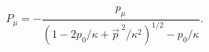 \begin{equation}
 P_{\mu}=-\frac{p_{\mu}}{(1-2p_{0}/\kappa
 +\vec{p}^{\;2}/\kappa^2)^{1/2}-p_{0}/\kappa}.
\end{equation}

